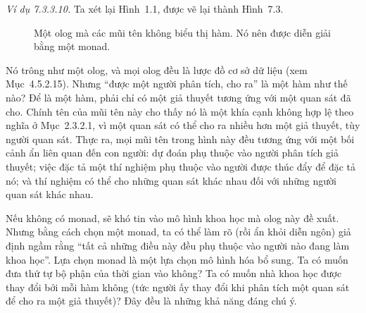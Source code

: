 \noindent\textit{Ví dụ 7.3.3.10.}\keepwithnext
Ta xét lại Hình~1.1, được vẽ lại thành Hình~7.3.
\begin{figure}[htbp]
\centering
{}
\setcounter{figure}{2}
\caption{Một olog mà các mũi tên không biểu thị hàm. Nó nên được diễn giải bằng một monad.}
\label{fig:ctseven-scientific-context}
\end{figure}

Nó trông như một olog, và mọi olog đều là lược đồ cơ sở dữ liệu (xem Mục~4.5.2.15). Nhưng ``được một người phân tích, cho ra'' là một hàm như thế nào? Để là một hàm, phải chỉ có một giả thuyết tương ứng với một quan sát đã cho. Chính tên của mũi tên này cho thấy nó là một khía cạnh không hợp lệ theo nghĩa ở Mục~2.3.2.1, vì một quan sát có thể cho ra nhiều hơn một giả thuyết, tùy người quan sát. Thực ra, mọi mũi tên trong hình này đều tương ứng với một bối cảnh ẩn liên quan đến con người: dự đoán phụ thuộc vào người phân tích giả thuyết; việc đặc tả một thí nghiệm phụ thuộc vào người được thúc đẩy để đặc tả nó; và thí nghiệm có thể cho những quan sát khác nhau đối với những người quan sát khác nhau.

Nếu không có monad, sẽ khó tin vào mô hình khoa học mà olog này đề xuất. Nhưng bằng cách chọn một monad, ta có thể làm rõ (rồi ẩn khỏi diễn ngôn) giả định ngầm rằng ``tất cả những điều này đều phụ thuộc vào người nào đang làm khoa học''. Lựa chọn monad là một lựa chọn mô hình hóa bổ sung. Ta có muốn đưa thứ tự bộ phận của thời gian vào không? Ta có muốn nhà khoa học được thay đổi bởi mỗi hàm không (tức người ấy thay đổi khi phân tích một quan sát để cho ra một giả thuyết)? Đây đều là những khả năng đáng chú ý.

